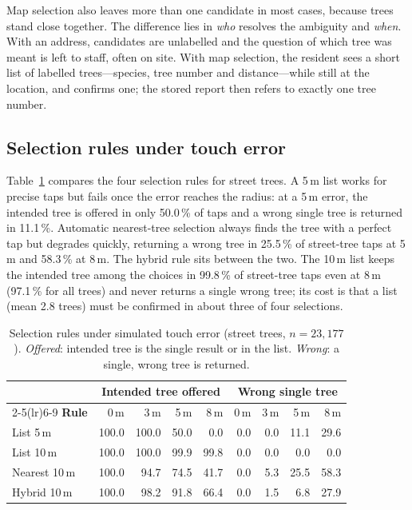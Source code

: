 \documentclass[11pt,a4paper]{article}
\begin{document}
Map selection also leaves more than one candidate in most cases, because trees stand close together. The difference lies in \emph{who} resolves the ambiguity and \emph{when}. With an address, candidates are unlabelled and the question of which tree was meant is left to staff, often on site. With map selection, the resident sees a short list of labelled trees---species, tree number and distance---while still at the location, and confirms one; the stored report then refers to exactly one tree number.

\subsection{Selection rules under touch error}
\label{sec:pick}

Table~\ref{tab:pick} compares the four selection rules for street trees. A 5\,m list works for precise taps but fails once the error reaches the radius: at a 5\,m error, the intended tree is offered in only 50.0\,\% of taps and a wrong single tree is returned in 11.1\,\%. Automatic nearest-tree selection always finds the tree with a perfect tap but degrades quickly, returning a wrong tree in 25.5\,\% of street-tree taps at 5\,m and 58.3\,\% at 8\,m. The hybrid rule sits between the two. The 10\,m list keeps the intended tree among the choices in 99.8\,\% of street-tree taps even at 8\,m (97.1\,\% for all trees) and never returns a single wrong tree; its cost is that a list (mean 2.8 trees) must be confirmed in about three of four selections.

\begin{table}[htbp]
\centering
\caption{Selection rules under simulated touch error (street trees, $n=23{,}177$). \emph{Offered}: intended tree is the single result or in the list. \emph{Wrong}: a single, wrong tree is returned.}
\label{tab:pick}
\begin{tabular}{@{}lrrrrrrrr@{}}
\toprule
& \multicolumn{4}{c}{\textbf{Intended tree offered}} & \multicolumn{4}{c}{\textbf{Wrong single tree}} \\
\cmidrule(lr){2-5}\cmidrule(lr){6-9}
\textbf{Rule} & 0\,m & 3\,m & 5\,m & 8\,m & 0\,m & 3\,m & 5\,m & 8\,m \\
\midrule
List 5\,m     & 100.0 & 100.0 & 50.0 & 0.0  & 0.0 & 0.0 & 11.1 & 29.6 \\
List 10\,m    & 100.0 & 100.0 & 99.9 & 99.8 & 0.0 & 0.0 & 0.0  & 0.0 \\
Nearest 10\,m & 100.0 & 94.7  & 74.5 & 41.7 & 0.0 & 5.3 & 25.5 & 58.3 \\
Hybrid 10\,m  & 100.0 & 98.2  & 91.8 & 66.4 & 0.0 & 1.5 & 6.8  & 27.9 \\
\bottomrule
\end{tabular}
\end{table}
\end{document}
